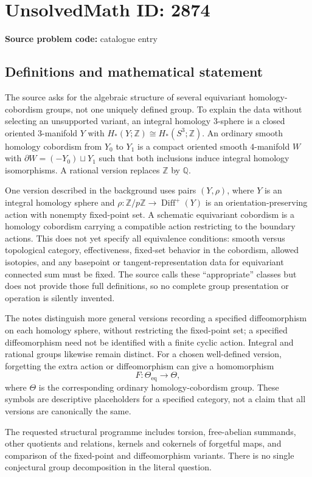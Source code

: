 \documentclass[11pt]{article}
\newcommand{\Z}{\mathbb{Z}}
\newcommand{\Q}{\mathbb{Q}}
\begin{document}
\section*{UnsolvedMath ID: 2874}
\textbf{Source problem code:} catalogue entry
\subsection{Definitions and mathematical statement}
The source asks for the algebraic structure of several equivariant homology-cobordism groups, not one uniquely defined group. To explain the data without selecting an unsupported variant, an integral homology $3$-sphere is a closed oriented $3$-manifold $Y$ with $H_*(Y;\Z)\cong H_*(S^3;\Z)$. An ordinary smooth homology cobordism from $Y_0$ to $Y_1$ is a compact oriented smooth $4$-manifold $W$ with $\partial W=(-Y_0)\sqcup Y_1$ such that both inclusions induce integral homology isomorphisms. A rational version replaces $\Z$ by $\Q$.

One version described in the background uses pairs $(Y,\rho)$, where $Y$ is an integral homology sphere and $\rho:\Z/p\Z\to\operatorname{Diff}^+(Y)$ is an orientation-preserving action with nonempty fixed-point set. A schematic equivariant cobordism is a homology cobordism carrying a compatible action restricting to the boundary actions. This does not yet specify all equivalence conditions: smooth versus topological category, effectiveness, fixed-set behavior in the cobordism, allowed isotopies, and any basepoint or tangent-representation data for equivariant connected sum must be fixed. The source calls these ``appropriate'' classes but does not provide those full definitions, so no complete group presentation or operation is silently invented.

The notes distinguish more general versions recording a specified diffeomorphism on each homology sphere, without restricting the fixed-point set; a specified diffeomorphism need not be identified with a finite cyclic action. Integral and rational groups likewise remain distinct. For a chosen well-defined version, forgetting the extra action or diffeomorphism can give a homomorphism
\[
F:\Theta_{\mathrm{eq}}\longrightarrow\Theta,
\]
where $\Theta$ is the corresponding ordinary homology-cobordism group. These symbols are descriptive placeholders for a specified category, not a claim that all versions are canonically the same.

The requested structural programme includes torsion, free-abelian summands, other quotients and relations, kernels and cokernels of forgetful maps, and comparison of the fixed-point and diffeomorphism variants. There is no single conjectural group decomposition in the literal question.
\end{document}
